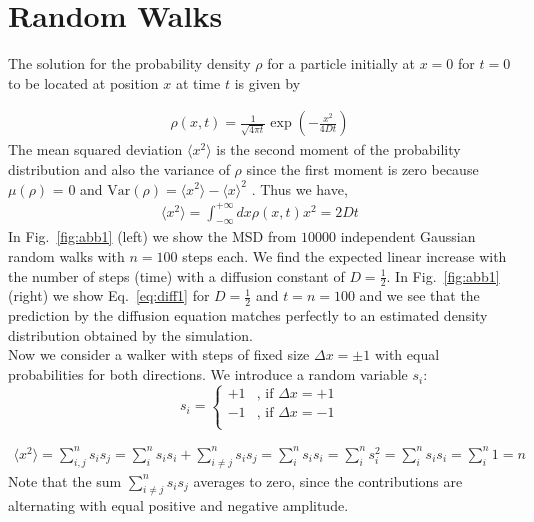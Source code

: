 \documentclass[12pt]{article}
\date{}
\begin{document}
 
 
 
 
 
\section{Random Walks}

 
The solution for the probability density $\rho$ for a particle
initially at $x=0$ for $t=0$ to be located at position $x$ at time $t$ is given by
 
\begin{align}
    \rho (x, t) = \frac{1}{\sqrt{4 \pi t}} \exp{   \left( -\frac{x^2}{4Dt} \right) }
\end{align}  
The mean squared deviation $  \langle x^2 \rangle $ is the second moment of the 
probability distribution and also the variance of $\rho$
since the first moment is zero because $\mu(\rho)$ = 0 and
$\text{Var}(\rho) =  \langle x^2 \rangle -  \langle x \rangle^2$ .
Thus we have,
\begin{align}
  \langle x^2 \rangle = \int_{-\infty}^{+\infty} dx \rho (x, t) x^2 = 2 Dt
  \label{eq:diff1}
\end{align}
In Fig.~\ref{fig:abb1} (left) we show the MSD from $10000$ independent Gaussian random walks with $n=100$ steps each.
We find the expected linear increase with the number of steps (time) with a diffusion constant of $D=\frac{1}{2}$.
In Fig.~\ref{fig:abb1} (right) we show Eq.~\ref{eq:diff1} for $D=\frac{1}{2}$ and $t= n=100$ and we see
that the prediction by the diffusion equation matches perfectly to an estimated density distribution obtained 
by the simulation.
\\
 
Now we consider a walker with steps of fixed size $\Delta x = \pm 1 $ with equal probabilities for  both directions.
We introduce a random variable $s_i$:
\[   
s_i = 
     \begin{cases}
       +1 & \text{, if }\Delta x = +1\\
       -1 & \text{, if }\Delta x = -1 \\
     \end{cases}
\]
 
 
 
\begin{align}
  \langle x^2 \rangle  = \sum_{i, j}^n s_i s_j = \sum_{i}^n s_i s_i  + \sum_{i \neq j}^n s_i s_j
  = \sum_{i}^n s_i s_i  = \sum_{i}^n s_{i}^2 = \sum_{i}^n s_i s_i  = \sum_{i}^n 1 = n  
\end{align}
Note that the sum $\sum_{i \neq j}^n s_i s_j$ averages to zero, since the contributions are alternating with
equal positive and negative amplitude.
 
\end{document}
